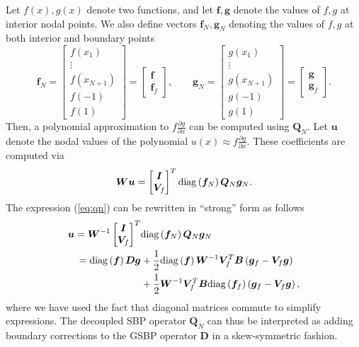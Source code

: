 \documentclass[onefignum,onetabnum,final]{siamart171218}
\newcommand{\pd}[2]{\frac{\partial#1}{\partial#2}}
\newcommand{\LRp}[1]{\left( #1 \right)}
\newcommand{\diag}[1]{{\rm diag}\LRp{#1}}
\begin{document}
Let $f(x), g(x)$ denote two functions, and let $\bm{f}, \bm{g}$ denote the values of $f,g$ at interior nodal points.  We also define vectors $\bm{f}_N, \bm{g}_N$ denoting the values of $f,g$ at both interior and boundary points 
\begin{equation}
\bm{f}_N = \begin{bmatrix}
f\LRp{x_1}\\
\vdots\\
f\LRp{x_{N+1}}\\
f(-1)\\
f(1)
\end{bmatrix} = \begin{bmatrix}
\bm{f} \\
\bm{f}_f
\end{bmatrix}, \qquad
\bm{g}_N = \begin{bmatrix}
g\LRp{x_1}\\
\vdots\\
g\LRp{x_{N+1}}\\
g(-1)\\
g(1)
\end{bmatrix} = \begin{bmatrix}
\bm{g} \\
\bm{g}_f
\end{bmatrix}.
\label{eq:fg}
\end{equation}
Then, a polynomial approximation to $f\pd{g}{x}$ can be computed using $\bm{Q}_N$.  Let $\bm{u}$ denote the nodal values of the polynomial $u(x) \approx f\pd{g}{x}$.  These coefficients are computed via
\begin{equation}
\bm{W}\bm{u} = \begin{bmatrix}
\bm{I}\\
\bm{V}_f
\end{bmatrix}^T \diag{\bm{f}_N} \bm{Q}_N \bm{g}_N.
\label{eq:qn}
\end{equation}
The expression (\ref{eq:qn}) can be rewritten in ``strong'' form as follows
\begin{align*}
\bm{u} = \bm{W}^{-1}\begin{bmatrix}
\bm{I}\\
\bm{V}_f
\end{bmatrix}^T& \diag{\bm{f}_N} \bm{Q}_N \bm{g}_N \\
= \diag{\bm{f}}\bm{D}\bm{g} &+ \frac{1}{2}\diag{\bm{f}} \bm{W}^{-1} \bm{V}_f^T \bm{B}\LRp{\bm{g}_f - \bm{V}_f\bm{g}} \\
&+ \frac{1}{2}\bm{W}^{-1} \bm{V}_f^T\bm{B}\diag{\bm{f}_f} \LRp{\bm{g}_f - \bm{V}_f\bm{g}},
\end{align*}
where we have used the fact that diagonal matrices commute to simplify expressions.  The decoupled SBP operator $\bm{Q}_N$ can thus be interpreted as adding boundary corrections to the GSBP operator $\bm{D}$ in a skew-symmetric fashion.  
\end{document}
